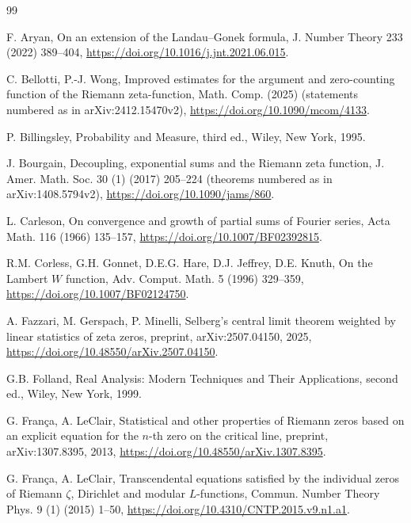 \documentclass[preprint,12pt]{elsarticle}
\numberwithin{equation}{section}
\theoremstyle{plain}
\theoremstyle{definition}
\theoremstyle{remark}
\begin{document}
\begin{thebibliography}{99}

F. Aryan, On an extension of the Landau--Gonek formula, J. Number Theory 233 (2022) 389--404, \href{https://doi.org/10.1016/j.jnt.2021.06.015}{https://doi.org/10.1016/j.jnt.2021.06.015}.

C. Bellotti, P.-J. Wong, Improved estimates for the argument and zero-counting function of the Riemann zeta-function, Math. Comp. (2025) (statements numbered as in arXiv:2412.15470v2), \href{https://doi.org/10.1090/mcom/4133}{https://doi.org/10.1090/mcom/4133}.

P. Billingsley, Probability and Measure, third ed., Wiley, New York, 1995.

J. Bourgain, Decoupling, exponential sums and the Riemann zeta function, J. Amer. Math. Soc. 30 (1) (2017) 205--224 (theorems numbered as in arXiv:1408.5794v2), \href{https://doi.org/10.1090/jams/860}{https://doi.org/10.1090/jams/860}.

L. Carleson, On convergence and growth of partial sums of Fourier series, Acta Math. 116 (1966) 135--157, \href{https://doi.org/10.1007/BF02392815}{https://doi.org/10.1007/BF02392815}.

R.M. Corless, G.H. Gonnet, D.E.G. Hare, D.J. Jeffrey, D.E. Knuth, On the Lambert $W$ function, Adv. Comput. Math. 5 (1996) 329--359, \href{https://doi.org/10.1007/BF02124750}{https://doi.org/10.1007/BF02124750}.

A. Fazzari, M. Gerspach, P. Minelli, Selberg's central limit theorem weighted by linear statistics of zeta zeros, preprint, arXiv:2507.04150, 2025, \href{https://doi.org/10.48550/arXiv.2507.04150}{https://doi.org/10.48550/arXiv.2507.04150}.

G.B. Folland, Real Analysis: Modern Techniques and Their Applications, second ed., Wiley, New York, 1999.

G. Fran\c{c}a, A. LeClair, Statistical and other properties of Riemann zeros based on an explicit equation for the $n$-th zero on the critical line, preprint, arXiv:1307.8395, 2013, \href{https://doi.org/10.48550/arXiv.1307.8395}{https://doi.org/10.48550/arXiv.1307.8395}.

G. Fran\c{c}a, A. LeClair, Transcendental equations satisfied by the individual zeros of Riemann $\zeta$, Dirichlet and modular $L$-functions, Commun. Number Theory Phys. 9 (1) (2015) 1--50, \href{https://doi.org/10.4310/CNTP.2015.v9.n1.a1}{https://doi.org/10.4310/CNTP.2015.v9.n1.a1}.


\end{thebibliography}
\end{document}
